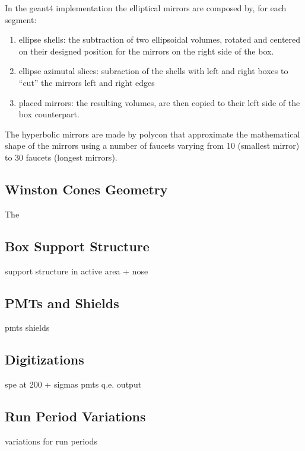 In the geant4 implementation the elliptical mirrors are composed by, for each segment:

\begin{enumerate}
	\item ellipse shells: the subtraction of two ellipsoidal volumes, rotated and centered on their designed position for the mirrors on the right side of the box.
	\item ellipse azimutal slices: subraction of the shells with left and right boxes to ``cut'' the mirrors left and right edges
	\item placed mirrors: the resulting volumes,  are then copied to their left side of the box counterpart.
\end{enumerate}

The hyperbolic mirrors are made by polycon that approximate the mathematical shape of the mirrors using a number of faucets
varying from 10 (smallest mirror) to 30 faucets (longest mirrors).


\subsection{Winston Cones Geometry}
The 

\subsection{Box Support Structure}

support structure in active area  + nose

\subsection{PMTs and Shields}

pmts shields

\subsection{Digitizations}

spe at 200 + sigmas
pmts q.e.
output

\subsection{Run Period Variations}


variations for run periods



